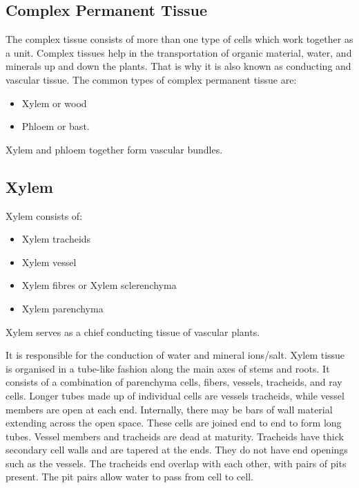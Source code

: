 \hypertarget{complex-permanent-tissue}{%
\subsection{Complex Permanent Tissue}\label{complex-permanent-tissue}}

The complex tissue consists of more than one type of cells which work together as a unit. Complex tissues help in the transportation of organic material, water, and minerals up and down the plants. That is why it is also known as conducting and vascular tissue. The common types of complex permanent tissue are:

\begin{itemize}
\tightlist
\item
  Xylem or wood
\item
  Phloem or bast.
\end{itemize}

Xylem and phloem together form vascular bundles.

\hypertarget{xylem}{%
\subsection{Xylem}\label{xylem}}

Xylem consists of:

\begin{itemize}
\tightlist
\item
  Xylem tracheids
\item
  Xylem vessel
\item
  Xylem fibres or Xylem sclerenchyma
\item
  Xylem parenchyma
\end{itemize}

Xylem serves as a chief conducting tissue of vascular plants.

It is responsible for the conduction of water and mineral ions/salt. Xylem tissue is organised in a tube-like fashion along the main axes of stems and roots. It consists of a combination of parenchyma cells, fibers, vessels, tracheids, and ray cells. Longer tubes made up of individual cells are vessels tracheids, while vessel members are open at each end. Internally, there may be bars of wall material extending across the open space. These cells are joined end to end to form long tubes. Vessel members and tracheids are dead at maturity. Tracheids have thick secondary cell walls and are tapered at the ends. They do not have end openings such as the vessels. The tracheids end overlap with each other, with pairs of pits present. The pit pairs allow water to pass from cell to cell.

